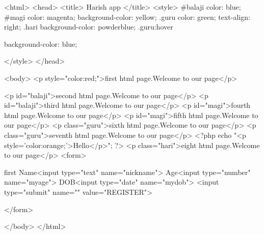<html>
<head>
<title>
Harish app
</title>
<style>
	#balaji{
		color: blue;
	}
	#magi{
		color: magenta;
		background-color: yellow;
	}
	.guru{
		color: green;
		text-align: right;
	}
	.hari{
		background-color: powderblue;
	}
	.guru:hover{
		background-color: blue;
		
	}
</style>
</head>

<body>
	<p style="color:red;">first html page.Welcome to our page</p>

	<p id="balaji">second html page.Welcome to our page</p>
	<p id="balaji">third html page.Welcome to our page</p>
	<p id="magi">fourth html page.Welcome to our page</p>
	<p id="magi">fifth html page.Welcome to our page</p>
	<p class="guru">sixth html page.Welcome to our page</p>
	<p class="guru">seventh html page.Welcome to our page</p>
	<?php
	echo "<p style='color:orange;'>Hello</p>";
	?>
<p class="hari">eight html page.Welcome to our page</p>
<form>

first Name<input type="text" name="nickname">
Age<input type="number" name="myage">
DOB<input type="date" name="mydob">
<input type="submit" name="" value="REGISTER">


	</form>


	</body>
</html>